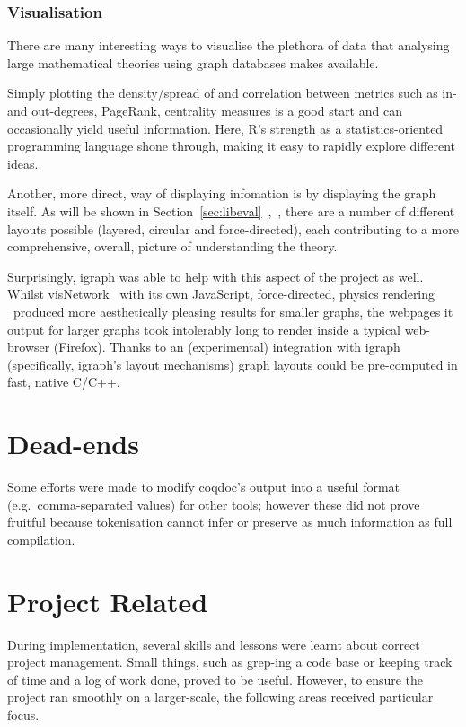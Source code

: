 \subsubsection{Visualisation}

There are many interesting ways to visualise the plethora of data that
analysing large mathematical theories using graph databases makes available.

Simply plotting the density/spread of and correlation between metrics such as
in- and out-degrees, PageRank, centrality measures is a good start and can
occasionally yield useful information. Here, R's strength as a
statistics-oriented programming language shone through, making it easy to
rapidly explore different ideas.

Another, more direct, way of displaying infomation is by displaying the graph
itself. As will be shown in
Section~\ref{sec:libeval}~,~, there
are a number of different layouts possible (layered, circular and
force-directed), each contributing to a more comprehensive, overall, picture of
understanding the theory.

Surprisingly, igraph was able to help with this aspect of the project as well.
Whilst visNetwork \textendash~with its own JavaScript, force-directed, physics
rendering \textendash~produced more aesthetically pleasing results for smaller
graphs, the webpages it output for larger graphs took intolerably long to render
inside a typical web-browser (Firefox). Thanks to an (experimental) integration
with igraph (specifically, igraph's layout mechanisms) graph layouts could be
pre-computed in fast, native C/C++.

\section{Dead-ends}

 Some efforts were made to modify coqdoc's output into a useful format (e.g.\
 comma-separated values) for other tools; however these did not prove fruitful
 because tokenisation cannot infer or preserve as much information as full
 compilation.

\section{Project Related}

During implementation, several skills and lessons were learnt about correct
project management. Small things, such as grep-ing a code base or keeping track of
time and a log of work done, proved to be useful. However, to ensure the
project ran smoothly on a larger-scale, the following areas received particular
focus.


